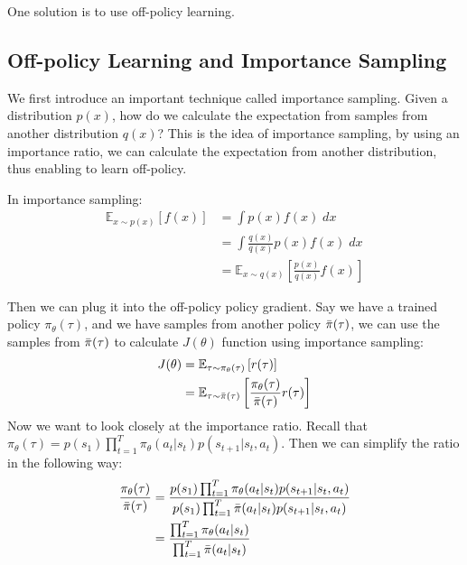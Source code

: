 One solution is to use off-policy learning.

\subsection{Off-policy Learning and Importance Sampling}
We first introduce an important technique called importance sampling. Given a distribution $p(x)$, how do we calculate the expectation from samples from another distribution $q(x)$? This is the idea of importance sampling, by using an importance ratio, we can calculate the expectation from another distribution, thus enabling to learn off-policy. 

In importance sampling:
\begin{align*}
    \mathbb{E}_{x\sim p(x)}\left[f(x)\right] &= \int p(x)f(x)\;dx\\
    &=\int \frac{q(x)}{q(x)}p(x)f(x)\;dx\\
    &=\mathbb{E}_{x\sim q(x)}\left[\frac{p(x)}{q(x)}f(x)\right]
\end{align*}

Then we can plug it into the off-policy policy gradient. Say we have a trained policy $\pi_\theta(\tau)$, and we have samples from another policy $\Bar{\pi}(\tau)$, we can use the samples from $\Bar{\pi}(\tau)$ to calculate $J(\theta)$ function using importance sampling:
\begin{align*}
    J(\theta) &= \mathbb{E}_{\tau\sim\pi_\theta(\tau)}\left[r(\tau)\right]\\
    &= \mathbb{E}_{\tau\sim\Bar{\pi}(\tau)}\left[ \frac{\pi_\theta(\tau)}{\Bar{\pi}(\tau)} r(\tau)\right]
\end{align*}
Now we want to look closely at the importance ratio. Recall that $\pi_\theta(\tau) = p(s_1)\prod_{t=1}^T\pi_\theta(a_t|s_t)p(s_{t+1}|s_t,a_t)$. Then we can simplify the ratio in the following way:
\begin{align*}
\frac{\pi_\theta(\tau)}{\Bar{\pi}(\tau)} &=\frac{p(s_1)\prod_{t=1}^T\pi_\theta(a_t|s_t)p(s_{t+1}|s_t,a_t)}{p(s_1)\prod_{t=1}^T\Bar{\pi}(a_t|s_t)p(s_{t+1}|s_t,a_t)}\\
&= \frac{\prod_{t=1}^T\pi_\theta(a_t|s_t)}{\prod_{t=1}^T\Bar{\pi}(a_t|s_t)}
\end{align*}
